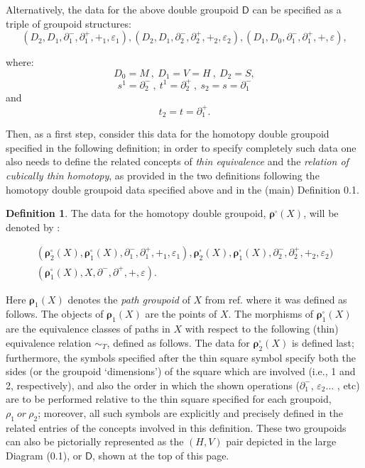 \documentclass[12pt]{article}
\theoremstyle{plain}
\theoremstyle{definition}
\newtheorem{definition}{Definition}[section]
\numberwithin{equation}{section}
\newcommand{\D}{\mathcal D}
\newcommand{\<}{{\langle}}
\def\D{\mathsf{D}}
\begin{document}
Alternatively, the data for the above double groupoid $\D$  can be specified as a triple of groupoid structures: 
$$(D_2,D_1, \partial^{-}_{1}, \partial^{+}_{1}, +_1,\varepsilon_1), (D_2,D_1,\partial^{-}_{2}, \partial^{+}_{2}, +_2, \varepsilon_2), (D_1, D_0, \partial^{-}_{1}, \partial^{+}_{1}, + , \varepsilon),$$

where: 
$$D_0 = M ~,~ D_1= V = H ~,~ D_2 = S,$$  
$$s^1 = \partial^{-}_{2}~,~ t^1 = \partial^{+}_{2}~,~ s_2 = s= \partial^{-}_{1}$$ and 
$$t_2 = t = \partial^{+}_{1}.$$ 

Then, as a first step, consider this data for the homotopy double groupoid specified in the following definition; 
in order to specify completely such data one also needs to define the related concepts of \emph{thin equivalence} and the \emph{relation of cubically thin homotopy}, as provided in the two definitions following the homotopy double groupoid data specified above and in the (main) Definition 0.1.  
 
\begin{definition}
The data for the homotopy double groupoid, $\boldsymbol{\rho}^{\square} (X) $, 
will be denoted by :

\[
\begin{array}{c}
(\boldsymbol{\rho}^{\square}_2 (X), \boldsymbol{\rho}_1^{\square} (X) ,
\partial^{-}_{1} , \partial^{+}_{1} , +_{1} , \varepsilon _{1}) ,
\boldsymbol{\rho}^{\square}_2 (X), \boldsymbol{\rho}^{\square}_1 (X) ,
\partial^{-}_{2} , \partial^{+}_{2} , +_{2} , \varepsilon _{2})\\[3mm]
(\boldsymbol{\rho}^{\square}_1 (X) , X , \partial^{-} , \partial^{+} , + , \varepsilon).
\end{array}\]
\bigbreak

 Here $\boldsymbol{\rho}_1 (X)$ denotes the \emph{path groupoid} of $X$
from ref. \cite{HKK}  where it was defined as follows. The objects of 
$\boldsymbol{\rho}_1 (X) $ are the points of $ X $. The morphisms of 
$\boldsymbol{\rho}^\square_1 (X) $ are the equivalence classes of paths in $ X$ with respect 
to the following (thin) equivalence relation $ \sim_{T} $, defined as follows. The data for 
$\boldsymbol{\rho}^{\square}_2 (X)$ is defined last; furthermore, the symbols specified after the thin square symbol specify both the sides (or the groupoid `dimensions') of the square which are involved (i.e., 1 and 2, respectively), and also the order in which the shown operations ($\partial^{-}_{1}$, $\varepsilon _{2}$... , etc) are to be performed relative to the thin square specified for each groupoid, $\rho_1 ~ or~ \rho_2$; moreover, all such symbols are explicitly and precisely defined in the related entries of the concepts involved in this definition. These two groupoids can also be pictorially represented as the $(H,V)$ pair depicted in the large Diagram (0.1), or $\D$, shown at the top of this page.
\end{definition}
\end{document}
